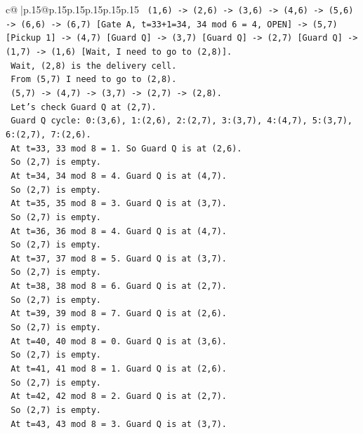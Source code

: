 \documentclass{article}
\begin{document}
{\begin{supertabular}{c@{$\;$}|p{.15\linewidth}@{}p{.15\linewidth}p{.15\linewidth}p{.15\linewidth}p{.15\linewidth}p{.15\linewidth}}
{{{\texttt{    (1,6) {-}> (2,6) {-}> (3,6) {-}> (4,6) {-}> (5,6) {-}> (6,6) {-}> (6,7) {[}Gate A, t=33+1=34, 34 mod 6 = 4, OPEN{]} {-}> (5,7) {[}Pickup 1{]} {-}> (4,7) {[}Guard Q{]} {-}> (3,7) {[}Guard Q{]} {-}> (2,7) {[}Guard Q{]} {-}> (1,7) {-}> (1,6) {[}Wait, I need to go to (2,8){]}.} \\
\texttt{    Wait, (2,8) is the delivery cell.} \\
\texttt{    From (5,7) I need to go to (2,8).} \\
\texttt{    (5,7) {-}> (4,7) {-}> (3,7) {-}> (2,7) {-}> (2,8).} \\
\texttt{    Let's check Guard Q at (2,7).} \\
\texttt{    Guard Q cycle: 0:(3,6), 1:(2,6), 2:(2,7), 3:(3,7), 4:(4,7), 5:(3,7), 6:(2,7), 7:(2,6).} \\
\texttt{    At t=33, 33 mod 8 = 1. So Guard Q is at (2,6).} \\
\texttt{    So (2,7) is empty.} \\
\texttt{    At t=34, 34 mod 8 = 4. Guard Q is at (4,7).} \\
\texttt{    So (2,7) is empty.} \\
\texttt{    At t=35, 35 mod 8 = 3. Guard Q is at (3,7).} \\
\texttt{    So (2,7) is empty.} \\
\texttt{    At t=36, 36 mod 8 = 4. Guard Q is at (4,7).} \\
\texttt{    So (2,7) is empty.} \\
\texttt{    At t=37, 37 mod 8 = 5. Guard Q is at (3,7).} \\
\texttt{    So (2,7) is empty.} \\
\texttt{    At t=38, 38 mod 8 = 6. Guard Q is at (2,7).} \\
\texttt{    So (2,7) is empty.} \\
\texttt{    At t=39, 39 mod 8 = 7. Guard Q is at (2,6).} \\
\texttt{    So (2,7) is empty.} \\
\texttt{    At t=40, 40 mod 8 = 0. Guard Q is at (3,6).} \\
\texttt{    So (2,7) is empty.} \\
\texttt{    At t=41, 41 mod 8 = 1. Guard Q is at (2,6).} \\
\texttt{    So (2,7) is empty.} \\
\texttt{    At t=42, 42 mod 8 = 2. Guard Q is at (2,7).} \\
\texttt{    So (2,7) is empty.} \\
\texttt{    At t=43, 43 mod 8 = 3. Guard Q is at (3,7).} \\
}}}
\end{supertabular}}
\end{document}
